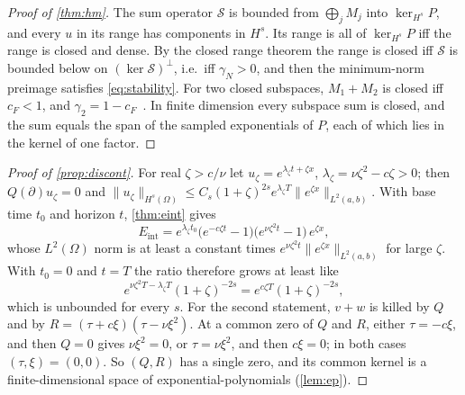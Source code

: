 \documentclass[11pt]{article}
\theoremstyle{plain}
\theoremstyle{definition}
\theoremstyle{remark}
\newcommand{\sumop}{\mathcal{S}}            %
\newcommand{\Eint}{E_{\mathrm{int}}}        %
\newcommand{\cF}{c_{F}}                     %
\newcommand{\gN}{\gamma_{N}}                %
\newcommand{\Hs}{H^{s}}                     %
\newcommand{\norm}[1]{\lVert#1\rVert}
\begin{document}
\begin{proof}[Proof of \cref{thm:hm}]
The sum operator $\sumop$ is bounded from $\bigoplus_jM_j$ into $\ker_{\Hs}P$, and every $u$ in its range has
components in $\Hs$. Its range is all of $\ker_{\Hs}P$ iff the range is closed and dense. By the closed range theorem the
range is closed iff $\sumop$ is bounded below on $(\ker\sumop)^\perp$, i.e.\ iff $\gN>0$, and then the minimum-norm
preimage satisfies \eqref{eq:stability}. For two closed subspaces, $M_1+M_2$ is closed iff $\cF<1$, and
$\gamma_2=1-\cF$~\cite{Deu01}. In finite dimension every subspace sum is closed, and the sum equals the span of
the sampled exponentials of $P$, each of which lies in the kernel of one factor.
\end{proof}

\begin{proof}[Proof of \cref{prop:discont}]
For real $\zeta>c/\nu$ let $u_\zeta=e^{\lambda_\zeta t+\zeta x}$, $\lambda_\zeta=\nu\zeta^2-c\zeta>0$; then $Q(\partial)u_\zeta=0$ and
$\norm{u_\zeta}_{\Hs(\Omega)}\le C_s(1+\zeta)^{2s}e^{\lambda_\zeta T}\norm{e^{\zeta x}}_{L^2(a,b)}$. With base time $t_0$ and horizon
$t$, \cref{thm:eint} gives
\[
  \Eint=e^{\lambda_\zeta t_0}\big(e^{-c\zeta t}-1\big)\big(e^{\nu\zeta^2t}-1\big)\,e^{\zeta x},
\]
whose $L^2(\Omega)$ norm is at least a constant times $e^{\nu\zeta^2t}\norm{e^{\zeta x}}_{L^2(a,b)}$ for large $\zeta$. With
$t_0=0$ and $t=T$ the ratio therefore grows at least like
\[
  e^{\nu\zeta^2T-\lambda_\zeta T}(1+\zeta)^{-2s}=e^{c\zeta T}(1+\zeta)^{-2s},
\]
which is unbounded for every $s$. For the second statement, $v+w$ is killed by $Q$ and by
$R=(\tau+c\xi)(\tau-\nu\xi^2)$. At a common zero of $Q$ and $R$, either $\tau=-c\xi$, and then $Q=0$ gives
$\nu\xi^2=0$, or $\tau=\nu\xi^2$, and then $c\xi=0$; in both cases $(\tau,\xi)=(0,0)$. So $(Q,R)$ has a single zero, and
its common kernel is a finite-dimensional space of exponential-polynomials (\cref{lem:ep}).
\end{proof}



\end{document}
